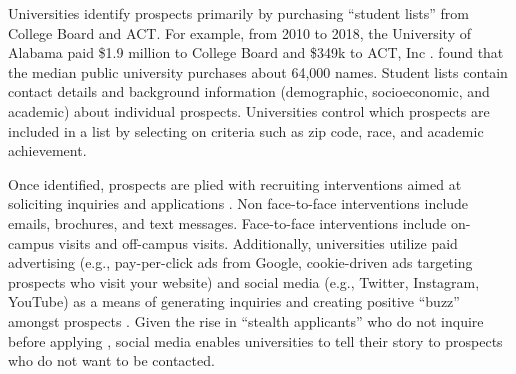 \documentclass[twoside]{article}
\begin{document}


Universities identify prospects primarily by purchasing ``student lists'' from College Board and ACT. For example, from 2010 to 2018, the University of Alabama paid \$1.9 million to College Board and \$349k to ACT, Inc \citep{RN4035}. \cite{RN4314} found that the median public university purchases about 64,000 names. Student lists contain contact details and background information (demographic, socioeconomic, and academic) about individual prospects. Universities control which prospects are included in a list by selecting on criteria such as zip code, race, and academic achievement.

Once identified, prospects are plied with recruiting interventions aimed at soliciting inquiries and applications \citep{RN4323}. Non face-to-face interventions include emails, brochures, and text messages.  Face-to-face interventions include on-campus visits and off-campus visits. Additionally, universities utilize paid advertising (e.g., pay-per-click ads from Google, cookie-driven ads targeting prospects who visit your website) and social media (e.g., Twitter, Instagram, YouTube) as a means of generating inquiries and creating positive ``buzz'' amongst prospects \citep{RN4134}. Given the rise in ``stealth applicants'' who do not inquire before applying \citep{RN4411}, social media enables universities to tell their story to prospects who do not want to be contacted.
\end{document}

